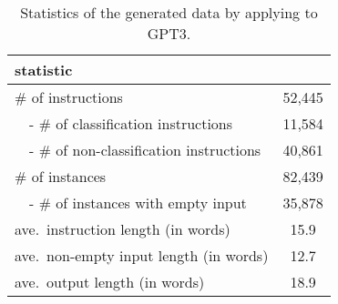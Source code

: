 \begin{table}[h]
    \centering
    \small
    \begin{tabular}{lc}
    \hline
    \toprule
    statistic &  \\ 
    \midrule
    \# of instructions & 52,445 \\
    ~~- \# of classification instructions & 11,584 \\
    ~~- \# of non-classification instructions & 40,861 \\
    \# of instances & 82,439 \\
    ~~- \# of instances with empty input & 35,878 \\
    ave.~instruction length (in words) & 15.9 \\
    ave.~non-empty input length (in words) & 12.7 \\
    ave.~output length (in words) &  18.9 \\
    \bottomrule
    \end{tabular}
    \caption{
        Statistics of the generated data by applying \name{} to GPT3.
    }
    \label{tab:data_statistics}
\end{table}